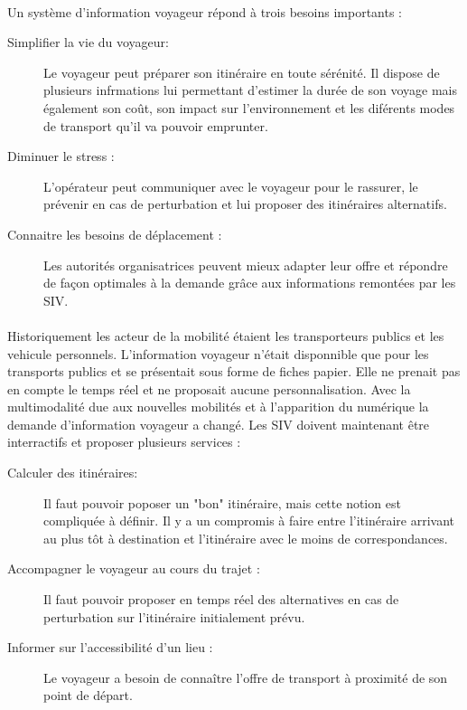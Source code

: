 \documentclass[a4paper]{report}
\begin{document}
\paragraph{} Un système d'information voyageur répond à trois besoins importants : 
				
\begin{description}
	\item[Simplifier la vie du voyageur:] Le voyageur peut préparer son itinéraire en toute sérénité. Il dispose de plusieurs infrmations lui permettant d'estimer la durée de son voyage 		mais également son coût, son impact sur l'environnement et les diférents modes de transport qu'il va pouvoir emprunter.
	\item[Diminuer le stress :] L'opérateur peut communiquer avec le voyageur pour le rassurer, le prévenir en cas de perturbation et lui proposer des itinéraires alternatifs.
	\item[Connaitre les besoins de déplacement :] Les autorités organisatrices peuvent mieux adapter leur offre et répondre de façon optimales à la demande grâce aux informations 	remontées par les SIV.
\end{description}

\paragraph{} Historiquement les acteur de la mobilité étaient les transporteurs publics et les vehicule personnels. L'information voyageur n'était disponnible que pour les transports publics et se présentait sous forme de fiches papier. Elle ne prenait pas en compte le temps réel et ne proposait aucune personnalisation. Avec la multimodalité due aux nouvelles mobilités et à l'apparition du numérique la demande d'information voyageur a changé. Les SIV doivent maintenant être interractifs et proposer plusieurs services :
				
\begin{description}
	\item[Calculer des itinéraires:]  Il faut pouvoir poposer un "bon" itinéraire, mais cette notion est compliquée à définir. Il y a un compromis à faire entre l'itinéraire arrivant au 		plus tôt à destination et l'itinéraire avec le moins de correspondances.
	\item[Accompagner le voyageur au cours du trajet :] Il faut pouvoir proposer en temps réel des alternatives en cas de perturbation sur l'itinéraire initialement prévu.
	\item[Informer sur l'accessibilité d'un lieu :] Le voyageur a besoin de connaître l'offre de transport à proximité de son point de départ.
\end{description}
\end{document}
